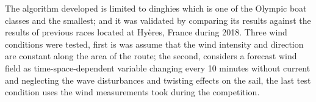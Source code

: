The algorithm developed is limited to dinghies which is one of the Olympic boat classes and the smallest; and it was validated by comparing its results against the results of previous races located at Hyères, France during 2018. Three wind conditions were tested, first is was assume that the wind intensity and direction are constant along the area of the route; the second, considers a forecast wind field as time-space-dependent variable changing every 10 minutes without current and neglecting the wave disturbances and twisting effects on the sail, the last test condition uses the wind measurements took during the competition. 

